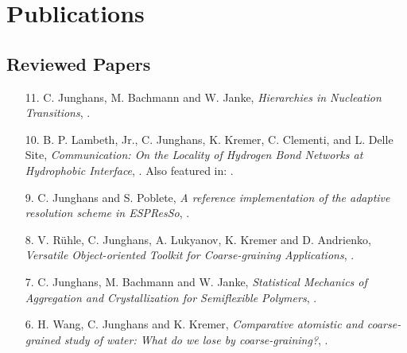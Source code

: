 \documentclass{article}
\begin{document}
\section*{Publications}

\subsection*{Reviewed Papers}

\begin{enumerate}
\item[11.] C. Junghans, M. Bachmann and W. Janke,
  \textit{Hierarchies in Nucleation Transitions},
  .

\item[10.] B. P. Lambeth, Jr., C. Junghans, K. Kremer, C. Clementi, and L. Delle Site, 
  \textit{Communication: On the Locality of Hydrogen Bond Networks at Hydrophobic Interface},
  .
  Also featured in: .

\item[9.] C. Junghans and S. Poblete,
  \textit{A reference implementation of the adaptive resolution scheme in ESPResSo},
  .

\item[8.] V. R{\"u}hle, C. Junghans, A. Lukyanov, K. Kremer and D. Andrienko,
  \textit{Versatile Object-oriented Toolkit for Coarse-graining Applications},
  . 

\item[7.] C. Junghans, M. Bachmann and W. Janke,
  \textit{Statistical Mechanics of Aggregation and Crystallization for Semiflexible Polymers},
  .

\item[6.] H. Wang, C. Junghans and K. Kremer,
  \textit{Comparative atomistic and coarse-grained study of water: What do we lose by coarse-graining?},
  .


\end{enumerate}
\end{document}

